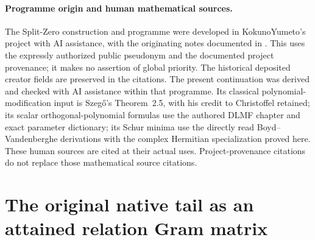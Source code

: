 \documentclass[11pt,a4paper]{article}
\begin{document}
\label{FRBUILD:receiver:end}
\clearpage


\label{MTBUILD:FORWARD_PROVENANCE:start}
\paragraph{Programme origin and human mathematical sources.}
The Split-Zero construction and programme were developed in
KokunoYumeto's project with AI assistance, with the originating
notes documented in \cite{human:globalization2026,
human:splitzero2026}. This uses the expressly authorized
public pseudonym and the documented project provenance; it makes
no assertion of global priority. The historical deposited creator
fields are preserved in the citations.
The present continuation was derived and checked with AI assistance
within that programme. Its classical polynomial-modification input
is Szeg\H{o}'s Theorem~2.5, with his credit to Christoffel retained;
its scalar orthogonal-polynomial formulas use the authored DLMF
chapter and exact parameter dictionary; its Schur minima use the
directly read Boyd--Vandenberghe derivations with the complex
Hermitian specialization proved here. These human sources are cited
at their actual uses. Project-provenance citations do not replace
those mathematical source citations.

\label{MTBUILD:FORWARD_PROVENANCE:end}

\clearpage
\label{MTBUILD:ORIGINAL_NATIVE_TAIL_GRAM:start}
\begingroup
\section{The original native tail as an attained relation Gram matrix}
\label{sec:NTG}
\end{document}
